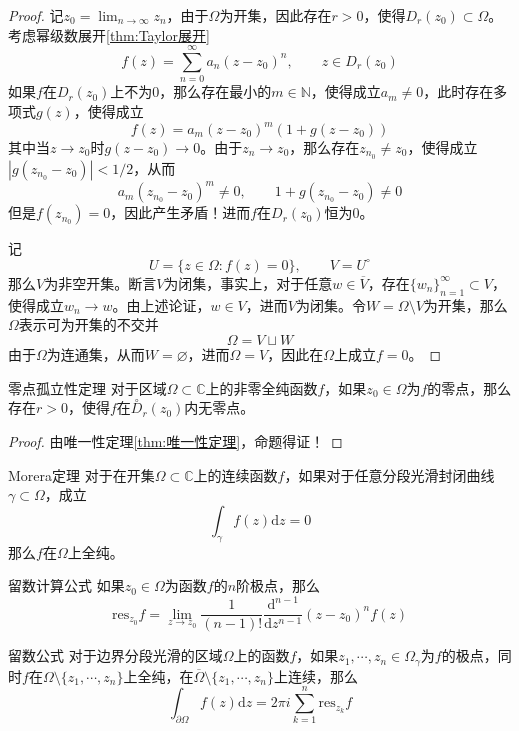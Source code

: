 \documentclass[lang = cn, scheme = chinese, thmcnt = section]{elegantbook}
\newcommand{\N}{\mathbb{N}}            %
\newcommand{\C}{\mathbb{C}}  		   %
\newcommand{\sub}{\subset}             %
\begin{document}
\begin{proof}
	记$\displaystyle z_0=\lim_{n\to\infty}{z_n}$，由于$\Omega$为开集，因此存在$r>0$，使得$D_r(z_0)\sub\Omega$。考虑幂级数展开\ref{thm:Taylor展开}%
	$$
	f(z)=\sum_{n=0}^{\infty}a_n(z-z_0)^n,\qquad 
	z\in D_r(z_0)
	$$
	如果$f$在$D_r(z_0)$上不为$0$，那么存在最小的$m\in\N$，使得成立$a_m\ne 0$，此时存在多项式$g(z)$，使得成立
	$$
	f(z)=a_m(z-z_0)^m(1+g(z-z_0))
	$$
	其中当$z\to z_0$时$g(z-z_0)\to 0$。由于$z_n\to z_0$，那么存在$z_{n_0}\ne z_0$，使得成立$|g(z_{n_0}-z_0)|<1/2$，从而%
	$$
	a_m(z_{n_0}-z_0)^m\ne 0,\qquad
	1+g(z_{n_0}-z_0)\ne 0
	$$
	但是$f(z_{n_0})=0$，因此产生矛盾！进而$f$在$D_r(z_0)$恒为$0$。
	
	记%
	$$
	U=\{ z\in\Omega:f(z)=0 \},\qquad V=U^\circ
	$$
	那么$V$为非空开集。断言$V$为闭集，事实上，对于任意$w\in \overline{V}$，存在$\{ w_n \}_{n=1}^{\infty}\sub V$，使得成立$w_n\to w$。由上述论证，$w\in V$，进而$V$为闭集。令$W=\Omega\setminus V$为开集，那么$\Omega$表示可为开集的不交并%
	$$
	\Omega=V\sqcup W
	$$
	由于$\Omega$为连通集，从而$W=\varnothing$，进而$\Omega=V$，因此在$\Omega$上成立$f=0$。
\end{proof}

\begin{corollary}{零点孤立性定理}
	对于区域$\Omega\sub\C$上的非零全纯函数$f$，如果$z_0\in\Omega$为$f$的零点，那么存在$r>0$，使得$f$在$\overset{\circ}{D}_r(z_0)$内无零点。
\end{corollary}

\begin{proof}
	由唯一性定理\ref{thm:唯一性定理}，命题得证！
\end{proof}

\begin{theorem}{Morera定理}
	对于在开集$\Omega\sub\C$上的连续函数$f$，如果对于任意分段光滑封闭曲线$\gamma\sub\Omega$，成立
	$$
	\int_\gamma{f(z)\mathrm{d}z}=0
	$$
	那么$f$在$\Omega$上全纯。
\end{theorem}

\begin{theorem}{留数计算公式}
	如果$z_0\in\Omega$为函数$f$的$n$阶极点，那么
	$$
	\mathrm{res}_{z_0}f=
	\lim_{z\to z_0}{\frac{1}{(n-1)!}\frac{\mathrm{d}^{n-1}}{\mathrm{d}z^{n-1}} (z-z_0)^n f(z)}
	$$
\end{theorem}

\begin{theorem}{留数公式}
	对于边界分段光滑的区域$\Omega$上的函数$f$，如果$z_1,\cdots,z_n\in\Omega_\gamma$为$f$的极点，同时$f$在$\Omega\setminus\{z_1,\cdots,z_n\}$上全纯，在$\overline{\Omega}\setminus\{z_1,\cdots,z_n\}$上连续，那么
	$$
	\int_{\partial\Omega}{f(z)\mathrm{d}z}=2\pi i \sum_{k=1}^{n}{\mathrm{res}_{z_k}f}
	$$
\end{theorem}
\end{document}
